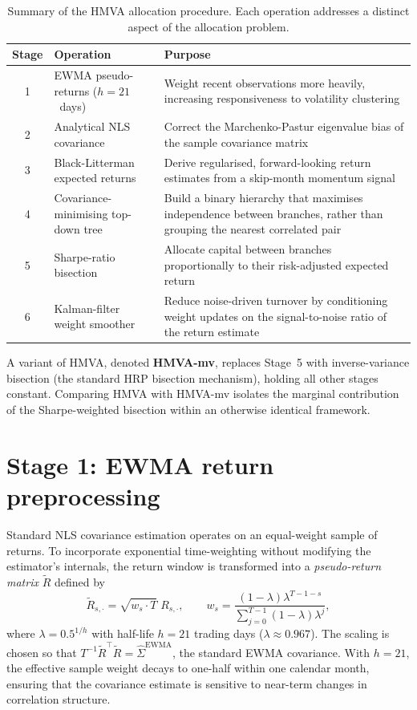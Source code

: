 \documentclass[a4paper,12pt]{report}
\begin{document}
\begin{table}[H]
  \centering
  \caption{Summary of the HMVA allocation procedure. Each operation
           addresses a distinct aspect of the allocation problem.}
  \label{tab:hmva-stages}
  \begin{tabular}{@{}clp{7.5cm}@{}}
    \toprule
    Stage & Operation & Purpose \\
    \midrule
    1 & EWMA pseudo-returns ($h=21$~days)
      & Weight recent observations more heavily, increasing responsiveness
        to volatility clustering \\[4pt]
    2 & Analytical NLS covariance
      & Correct the Marchenko-Pastur eigenvalue bias of the sample
        covariance matrix \\[4pt]
    3 & Black-Litterman expected returns
      & Derive regularised, forward-looking return estimates from a
        skip-month momentum signal \\[4pt]
    4 & Covariance-minimising top-down tree
      & Build a binary hierarchy that maximises independence between
        branches, rather than grouping the nearest correlated pair \\[4pt]
    5 & Sharpe-ratio bisection
      & Allocate capital between branches proportionally to their
        risk-adjusted expected return \\[4pt]
    6 & Kalman-filter weight smoother
      & Reduce noise-driven turnover by conditioning weight updates on
        the signal-to-noise ratio of the return estimate \\
    \bottomrule
  \end{tabular}
\end{table}

A variant of HMVA, denoted \textbf{HMVA-mv}, replaces Stage~5 with
inverse-variance bisection (the standard HRP bisection mechanism), holding
all other stages constant. Comparing HMVA with HMVA-mv isolates the marginal
contribution of the Sharpe-weighted bisection within an otherwise identical
framework.

\section{Stage 1: EWMA return preprocessing}
\label{sec:meth-ewma}

Standard NLS covariance estimation operates on an equal-weight sample of
returns. To incorporate exponential time-weighting without modifying the
estimator's internals, the return window is transformed into a
\emph{pseudo-return matrix} $\tilde{R}$ defined by
\begin{equation}
  \tilde{R}_{s,\cdot} = \sqrt{w_s \cdot T}\; R_{s,\cdot}, \qquad
  w_s = \frac{(1-\lambda)\lambda^{T-1-s}}{\sum_{j=0}^{T-1}(1-\lambda)\lambda^j},
  \label{eq:ewma-pseudo}
\end{equation}
where $\lambda = 0.5^{1/h}$ with half-life $h = 21$ trading days
($\lambda \approx 0.967$). The scaling is chosen so that
$T^{-1}\tilde{R}^{\top}\tilde{R} = \hat{\Sigma}^{\mathrm{EWMA}}$, the
standard EWMA covariance. With $h = 21$, the effective sample weight decays
to one-half within one calendar month, ensuring that the covariance estimate
is sensitive to near-term changes in correlation structure.
\end{document}
